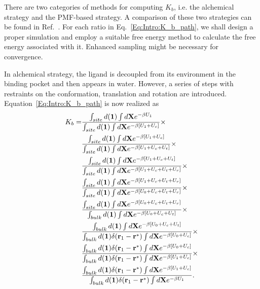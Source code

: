 There are two categories of methods for computing $K_b$, i.e. the alchemical strategy\cite{DengJCTC2006} and the PMF-based strategy\cite{WooPNAS2005}. A comparison of these two strategies can be found in Ref.~\cite{GumbartJCTC2013}. For each ratio in Eq.~\ref{Eq:Intro:K_b_path}, we shall design a proper simulation and employ a suitable free energy method to calculate the free energy associated with it. Enhanced sampling might be necessary for convergence.

In alchemical strategy, the ligand is decoupled from its environment in the binding pocket and then appears in water. However, a series of steps with restraints on the conformation, translation and rotation are introduced. Equation~\ref{Eq:Intro:K_b_path} is now realized as
\begin{align}
  K_b=&\frac{\int_{site}d(\mathbf{1})\int d\mathbf{X}e^{-\beta U_1}}{\int_{site}d(\mathbf{1})\int d\mathbf{X}e^{-\beta [U_1+U_c]}}\times\notag\\
      &\frac{\int_{site}d(\mathbf{1})\int d\mathbf{X}e^{-\beta [U_1+U_c]}}{\int_{site}d(\mathbf{1})\int d\mathbf{X}e^{-\beta [U_1+U_c+U_t]}}\times\notag\\
      &\frac{\int_{site}d(\mathbf{1})\int d\mathbf{X}e^{-\beta [U_1+U_c+U_t]}}{\int_{site}d(\mathbf{1})\int d\mathbf{X}e^{-\beta [U_1+U_c+U_t+U_r]}}\times\notag\\
      &\frac{\int_{site}d(\mathbf{1})\int d\mathbf{X}e^{-\beta [U_1+U_c+U_t+U_r]}}{\int_{site}d(\mathbf{1})\int d\mathbf{X}e^{-\beta [U_0+U_c+U_t+U_r]}}\times\notag\\
      &\frac{\int_{site}d(\mathbf{1})\int d\mathbf{X}e^{-\beta [U_0+U_c+U_t+U_r]}}{\int_{bulk}d(\mathbf{1})\int d\mathbf{X}e^{-\beta [U_0+U_c+U_t]}}\times\notag\\
      &\frac{\int_{bulk}d(\mathbf{1})\int d\mathbf{X}e^{-\beta [U_0+U_c+U_t]}}{\int_{bulk}d(\mathbf{1})\delta(\mathbf{r}_1-\mathbf{r}^*)\int d\mathbf{X}e^{-\beta [U_0+U_c]}}\times\notag\\
      &\frac{\int_{bulk}d(\mathbf{1})\delta(\mathbf{r}_1-\mathbf{r}^*)\int d\mathbf{X}e^{-\beta [U_0+U_c]}}{\int_{bulk}d(\mathbf{1})\delta(\mathbf{r}_1-\mathbf{r}^*)\int d\mathbf{X}e^{-\beta [U_1+U_c]}}\times\notag\\
      &\frac{\int_{bulk}d(\mathbf{1})\delta(\mathbf{r}_1-\mathbf{r}^*)\int d\mathbf{X}e^{-\beta [U_1+U_c]}}{\int_{bulk}d(\mathbf{1})\delta(\mathbf{r}_1-\mathbf{r}^*)\int d\mathbf{X}e^{-\beta U_1}}.
\end{align}

